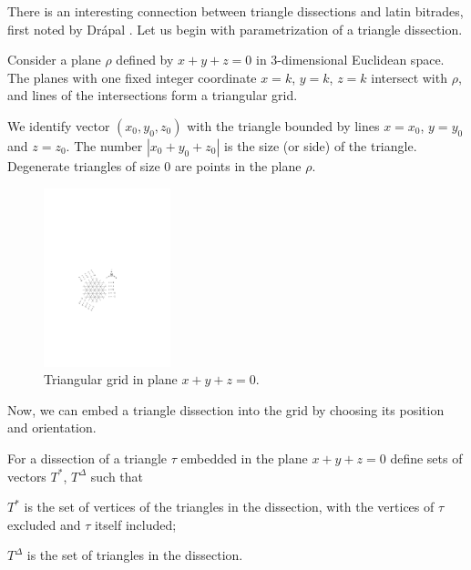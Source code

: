 There is an interesting connection between triangle dissections and latin bitrades, first noted by Drápal \cite{Drapal91}. Let us begin with parametrization of a triangle dissection.

Consider a plane $\rho$ defined by $x+y+z=0$ in 3-dimensional Euclidean space. The planes with one fixed integer coordinate $x=k$, $y=k$, $z=k$ intersect with $\rho$, and lines of the intersections form a triangular grid.

We identify vector $(x_0, y_0, z_0)$ with the triangle bounded by lines $x=x_0$, $y=y_0$ and $z=z_0$. The number $|x_0+y_0+z_0|$ is the size (or side) of the triangle. Degenerate triangles of size 0 are points in the plane $\rho$.

\begin{figure}[htb]
\centering
\includegraphics[height=14em]{img/trigrid.pdf}
\caption{Triangular grid in plane $x+y+z=0$.}
\label{fig:trigrid}
\end{figure}

Now, we can embed a triangle dissection into the grid by choosing its position and orientation.

\begin{defn}
For a dissection of a triangle $\tau$ embedded in the plane $x+y+z=0$ define sets of vectors $T^*$, $T^\Delta$ such that
\begin{cosyitemize}
	\item $T^*$ is the set of vertices of the triangles in the dissection, with the vertices of $\tau$ excluded and $\tau$ itself included;
	\item $T^\Delta$ is the set of triangles in the dissection.
\end{cosyitemize}%
\end{defn}

